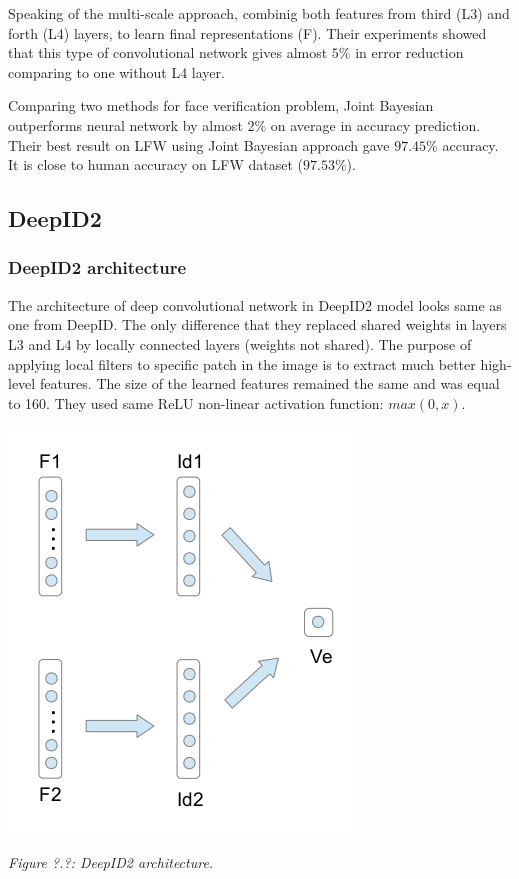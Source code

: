 \documentclass[paper=a4, fontsize=11pt]{scrartcl} %
\numberwithin{equation}{section} %
\numberwithin{figure}{section} %
\numberwithin{table}{section} %
\begin{document}
Speaking of the multi-scale approach, combinig both features from third (L3) and forth (L4) layers, to learn final representations (F). Their experiments showed that this type of convolutional network gives almost $5\%$ in error reduction comparing to one without L4 layer. \par

Comparing two methods for face verification problem, Joint Bayesian outperforms neural network by almost $2\%$ on average in accuracy prediction. Their best result on LFW using Joint Bayesian approach gave $97.45\%$ accuracy. It is close to human accuracy on LFW dataset ($97.53\%$).

\subsection{DeepID2}

\subsubsection{DeepID2 architecture}

The architecture of deep convolutional network in DeepID2 \cite{sun2014deep} model looks same as one from DeepID. The only difference that they replaced shared weights in layers L3 and L4 by locally connected layers (weights not shared). The purpose of applying local filters to specific patch in the image is to extract much better high-level features. The size of the learned features remained the same and was equal to 160. They used same ReLU non-linear activation function: $max(0,x)$. \par

\begin{center}
\includegraphics[scale=0.5]{pictures/deepid2.png}
\par\large\textit{Figure ?.?: DeepID2 architecture.}
\end{center}
\end{document}
